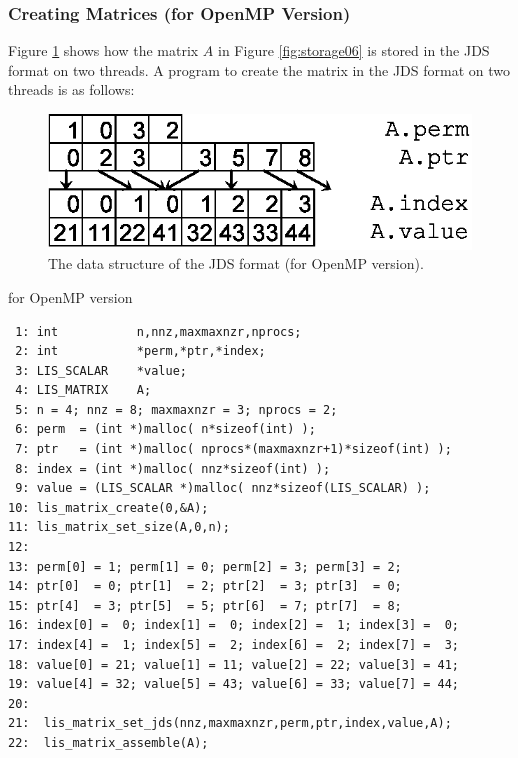 \documentclass[a4paper]{article}
\begin{document}
\subsubsection{Creating Matrices (for OpenMP Version)}
Figure \ref{fig:storage06_omp} shows how the matrix $A$ in Figure \ref{fig:storage06} is stored in the JDS format on two threads. A program to create the matrix in the JDS format on two threads is as follows:
\begin{figure}[h]
{\centering 
\includegraphics{storage06_omp.eps} 
\caption{The data structure of the JDS format (for OpenMP version).}\label{fig:storage06_omp}}
\end{figure}
\begin{itembox}[l]{for OpenMP version}
\small
\begin{verbatim}
 1: int           n,nnz,maxmaxnzr,nprocs;
 2: int           *perm,*ptr,*index;
 3: LIS_SCALAR    *value;
 4: LIS_MATRIX    A;
 5: n = 4; nnz = 8; maxmaxnzr = 3; nprocs = 2;
 6: perm  = (int *)malloc( n*sizeof(int) );
 7: ptr   = (int *)malloc( nprocs*(maxmaxnzr+1)*sizeof(int) );
 8: index = (int *)malloc( nnz*sizeof(int) );
 9: value = (LIS_SCALAR *)malloc( nnz*sizeof(LIS_SCALAR) );
10: lis_matrix_create(0,&A);
11: lis_matrix_set_size(A,0,n);
12:
13: perm[0] = 1; perm[1] = 0; perm[2] = 3; perm[3] = 2;
14: ptr[0]  = 0; ptr[1]  = 2; ptr[2]  = 3; ptr[3]  = 0;
15: ptr[4]  = 3; ptr[5]  = 5; ptr[6]  = 7; ptr[7]  = 8;
16: index[0] =  0; index[1] =  0; index[2] =  1; index[3] =  0;
17: index[4] =  1; index[5] =  2; index[6] =  2; index[7] =  3;
18: value[0] = 21; value[1] = 11; value[2] = 22; value[3] = 41;
19: value[4] = 32; value[5] = 43; value[6] = 33; value[7] = 44;
20:
21:  lis_matrix_set_jds(nnz,maxmaxnzr,perm,ptr,index,value,A);
22:  lis_matrix_assemble(A);
\end{verbatim}
\end{itembox}
\newpage
\end{document}
